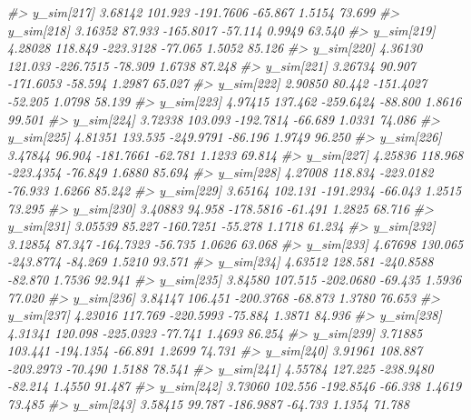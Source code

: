 \documentclass[
  10pt,
  italian,
  a4paper,
  extrafontsizes,onecolumn,openright
  ]{memoir}
\newenvironment{Shaded}{\begin{snugshade}}{\end{snugshade}}
\newcommand{\CommentTok}[1]{\textcolor[rgb]{0.56,0.35,0.01}{\textit{#1}}}
\begin{document}
\begin{Shaded}
\begin{Highlighting}[]
\CommentTok{\#\textgreater{}   y\_sim[217]  3.68142 101.923 {-}191.7606 {-}65.867  1.5154  73.699}
\CommentTok{\#\textgreater{}   y\_sim[218]  3.16352  87.933 {-}165.8017 {-}57.114  0.9949  63.540}
\CommentTok{\#\textgreater{}   y\_sim[219]  4.28028 118.849 {-}223.3128 {-}77.065  1.5052  85.126}
\CommentTok{\#\textgreater{}   y\_sim[220]  4.36130 121.033 {-}226.7515 {-}78.309  1.6738  87.248}
\CommentTok{\#\textgreater{}   y\_sim[221]  3.26734  90.907 {-}171.6053 {-}58.594  1.2987  65.027}
\CommentTok{\#\textgreater{}   y\_sim[222]  2.90850  80.442 {-}151.4027 {-}52.205  1.0798  58.139}
\CommentTok{\#\textgreater{}   y\_sim[223]  4.97415 137.462 {-}259.6424 {-}88.800  1.8616  99.501}
\CommentTok{\#\textgreater{}   y\_sim[224]  3.72338 103.093 {-}192.7814 {-}66.689  1.0331  74.086}
\CommentTok{\#\textgreater{}   y\_sim[225]  4.81351 133.535 {-}249.9791 {-}86.196  1.9749  96.250}
\CommentTok{\#\textgreater{}   y\_sim[226]  3.47844  96.904 {-}181.7661 {-}62.781  1.1233  69.814}
\CommentTok{\#\textgreater{}   y\_sim[227]  4.25836 118.968 {-}223.4354 {-}76.849  1.6880  85.694}
\CommentTok{\#\textgreater{}   y\_sim[228]  4.27008 118.834 {-}223.0182 {-}76.933  1.6266  85.242}
\CommentTok{\#\textgreater{}   y\_sim[229]  3.65164 102.131 {-}191.2934 {-}66.043  1.2515  73.295}
\CommentTok{\#\textgreater{}   y\_sim[230]  3.40883  94.958 {-}178.5816 {-}61.491  1.2825  68.716}
\CommentTok{\#\textgreater{}   y\_sim[231]  3.05539  85.227 {-}160.7251 {-}55.278  1.1718  61.234}
\CommentTok{\#\textgreater{}   y\_sim[232]  3.12854  87.347 {-}164.7323 {-}56.735  1.0626  63.068}
\CommentTok{\#\textgreater{}   y\_sim[233]  4.67698 130.065 {-}243.8774 {-}84.269  1.5210  93.571}
\CommentTok{\#\textgreater{}   y\_sim[234]  4.63512 128.581 {-}240.8588 {-}82.870  1.7536  92.941}
\CommentTok{\#\textgreater{}   y\_sim[235]  3.84580 107.515 {-}202.0680 {-}69.435  1.5936  77.020}
\CommentTok{\#\textgreater{}   y\_sim[236]  3.84147 106.451 {-}200.3768 {-}68.873  1.3780  76.653}
\CommentTok{\#\textgreater{}   y\_sim[237]  4.23016 117.769 {-}220.5993 {-}75.884  1.3871  84.936}
\CommentTok{\#\textgreater{}   y\_sim[238]  4.31341 120.098 {-}225.0323 {-}77.741  1.4693  86.254}
\CommentTok{\#\textgreater{}   y\_sim[239]  3.71885 103.441 {-}194.1354 {-}66.891  1.2699  74.731}
\CommentTok{\#\textgreater{}   y\_sim[240]  3.91961 108.887 {-}203.2973 {-}70.490  1.5188  78.541}
\CommentTok{\#\textgreater{}   y\_sim[241]  4.55784 127.225 {-}238.9480 {-}82.214  1.4550  91.487}
\CommentTok{\#\textgreater{}   y\_sim[242]  3.73060 102.556 {-}192.8546 {-}66.338  1.4619  73.485}
\CommentTok{\#\textgreater{}   y\_sim[243]  3.58415  99.787 {-}186.9887 {-}64.733  1.1354  71.788}

\end{Highlighting}
\end{Shaded}
\end{document}
